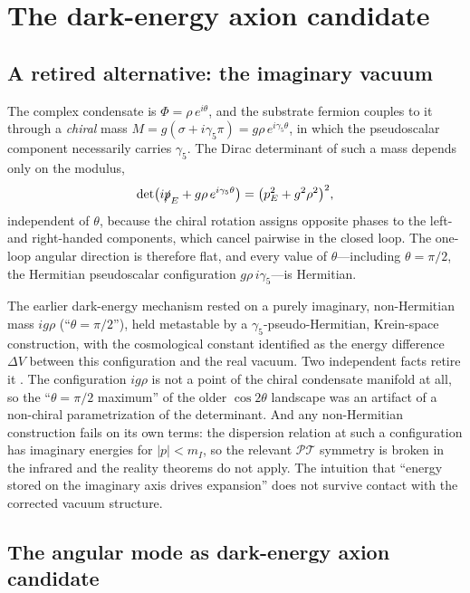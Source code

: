 \documentclass[11pt]{article}
\newcommand{\beq}{\begin{equation}}
\newcommand{\eeq}{\end{equation}}
\begin{document}
\section{The dark-energy axion candidate}
\label{sec:closed}

\subsection{A retired alternative: the imaginary vacuum}
\label{sec:imaginary}

The complex condensate is $\Phi = \rho\,e^{i\theta}$, and the
substrate fermion couples to it through a \emph{chiral} mass
$M = g(\sigma + i\gamma_5\pi) = g\rho\,e^{i\gamma_5\theta}$, in which
the pseudoscalar component necessarily carries $\gamma_5$.  The
Dirac determinant of such a mass depends only on the modulus,
\beq
\det\bigl(i\slashed{p}_E + g\rho\,e^{i\gamma_5\theta}\bigr)
= \bigl(p_E^2 + g^2\rho^2\bigr)^2 ,
\eeq
independent of $\theta$, because the chiral rotation assigns
opposite phases to the left- and right-handed components, which
cancel pairwise in the closed loop.  The one-loop angular direction
is therefore flat, and every value of $\theta$---including
$\theta = \pi/2$, the Hermitian pseudoscalar configuration
$g\rho\,i\gamma_5$---is Hermitian.

The earlier dark-energy mechanism rested on a purely imaginary,
non-Hermitian mass $i g\rho$ (``$\theta = \pi/2$''), held metastable
by a $\gamma_5$-pseudo-Hermitian, Krein-space construction, with the
cosmological constant identified as the energy difference $\Delta V$
between this configuration and the real vacuum.  Two independent
facts retire it \cite{Cheng:2026grav,Cheng:2026vector}.  The
configuration $ig\rho$ is not a point of the chiral condensate
manifold at all, so the ``$\theta = \pi/2$ maximum'' of the older
$\cos2\theta$ landscape was an artifact of a non-chiral
parametrization of the determinant.  And any non-Hermitian
construction fails on its own terms: the dispersion relation at such
a configuration has imaginary energies for $|p| < m_I$, so the
relevant $\mathcal{PT}$ symmetry is broken in the infrared and the
reality theorems do not apply.  The intuition that ``energy stored
on the imaginary axis drives expansion'' does not survive contact
with the corrected vacuum structure.

\subsection{The angular mode as dark-energy axion candidate}
\end{document}
